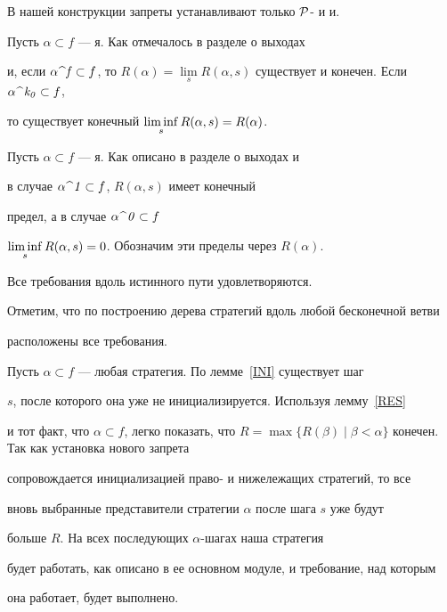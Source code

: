 \begin{pf}


В нашей конструкции запреты устанавливают только ${\cal P}$- и и.


Пусть $\alpha\subset f$ --- я. Как отмечалось в разделе о выходах


и, если $\con{\alpha}{{\it f\/}}\subset f$, то $R(\alpha)=\lim\limits_s


R(\alpha,s)$ существует и конечен. Если $\con{\alpha}{{\it k_0\/}}\subset f$,


то существует конечный $\limi\limits_s R(\alpha,s)=R(\alpha)$.





Пусть $\alpha\subset f$ --- я. Как описано в разделе о выходах и


в случае $\alpha\,\widehat{\ }\,{\it 1}\subset f$, $R(\alpha,s)$ имеет конечный


предел, а в случае $\alpha\,\widehat{\ }\,{\it 0\/}\subset f\;$


$\limi\limits_s R(\alpha,


s)=0$. Обозначим эти пределы через $R(\alpha)$.


\end{pf}





\begin{lth}\label{REQ}


Все требования вдоль истинного пути удовлетворяются.


\end{lth}





\begin{pf}


Отметим, что по построению дерева стратегий вдоль любой бесконечной ветви


расположены все требования.





Пусть $\alpha\subset f$ --- любая стратегия. По лемме~\ref{INI} существует шаг


$s$, после которого она уже не инициализируется. Используя лемму~\ref{RES}


и тот факт, что $\alpha\subset f$, легко показать, что $R=\max\{R


(\beta)\mid\beta<\alpha\}$ конечен. Так как установка нового запрета


сопровождается инициализацией право- и нижележащих стратегий, то все


вновь выбранные представители стратегии $\alpha$ после шага $s$ уже будут


больше $R$. На всех последующих $\alpha$-шагах наша стратегия


будет работать, как описано в ее основном модуле, и требование, над которым


она работает, будет выполнено.


\end{pf}





